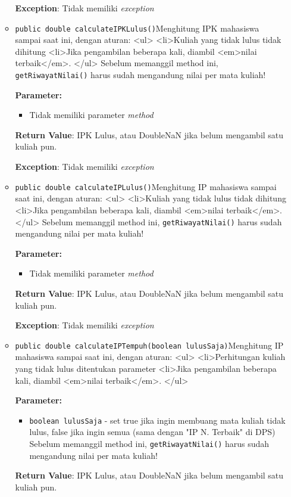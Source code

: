 \documentclass{article}
\begin{document}
\begin{enumerate}
\begin{itemize}
\textbf{Exception}: Tidak memiliki \textit{exception}

\item \texttt{public double calculateIPKLulus()}Menghitung IPK mahasiswa sampai saat ini, dengan aturan:
 <ul>
   <li>Kuliah yang tidak lulus tidak dihitung
   <li>Jika pengambilan beberapa kali, diambil <em>nilai terbaik</em>.
 </ul>
 Sebelum memanggil method ini, \texttt{getRiwayatNilai()} harus sudah mengandung nilai per mata kuliah!

\textbf{Parameter:}
\begin{itemize}
\item Tidak memiliki parameter \textit{method}
\end{itemize}
\textbf{Return Value}: IPK Lulus, atau  DoubleNaN jika belum mengambil satu kuliah pun.

\textbf{Exception}: Tidak memiliki \textit{exception}

\item \texttt{public double calculateIPLulus()}Menghitung IP mahasiswa sampai saat ini, dengan aturan:
 <ul>
   <li>Kuliah yang tidak lulus tidak dihitung
   <li>Jika pengambilan beberapa kali, diambil <em>nilai terbaik</em>.
 </ul>
 Sebelum memanggil method ini, \texttt{getRiwayatNilai()} harus sudah mengandung nilai per mata kuliah!

\textbf{Parameter:}
\begin{itemize}
\item Tidak memiliki parameter \textit{method}
\end{itemize}
\textbf{Return Value}: IPK Lulus, atau  DoubleNaN jika belum mengambil satu kuliah pun.

\textbf{Exception}: Tidak memiliki \textit{exception}

\item \texttt{public double calculateIPTempuh(boolean lulusSaja)}Menghitung IP mahasiswa sampai saat ini, dengan aturan:
 <ul>
   <li>Perhitungan kuliah yang tidak lulus ditentukan parameter
   <li>Jika pengambilan beberapa kali, diambil <em>nilai terbaik</em>.
 </ul>

\textbf{Parameter:}
\begin{itemize}
\item \texttt{boolean lulusSaja} - 
set true jika ingin membuang mata kuliah tidak lulus, false jika ingin semua (sama dengan "IP N. Terbaik" di DPS)
 Sebelum memanggil method ini, \texttt{getRiwayatNilai()} harus sudah mengandung nilai per mata kuliah!
\end{itemize}
\textbf{Return Value}: IPK Lulus, atau  DoubleNaN jika belum mengambil satu kuliah pun.


\end{itemize}
\end{enumerate}
\end{document}
